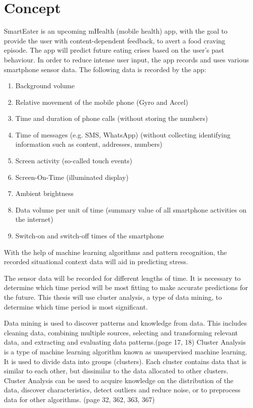 \documentclass[12pt,a4paper]{article}
\title{\titlename}
\author{ \authorid\\ \scriptsize \address }
\date{\exposedate}
\begin{document}

\maketitle

\section*{Concept}


SmartEater is an upcoming mHealth (mobile health) app, with the goal to provide the user with content-dependent feedback, to avert a food craving episode. The app will predict future eating crises based on the user's past behaviour. In order to reduce intense user input, the app records and uses various smartphone sensor data. The following data is recorded by the app:

\begin{enumerate}
	\item Background volume
	\item Relative movement of the mobile phone (Gyro and Accel)
	\item Time and duration of phone calls (without storing the numbers)
	\item Time of messages (e.g. SMS, WhatsApp) (without collecting identifying information such as content, addresses, numbers)
	\item Screen activity (so-called touch events)
	\item Screen-On-Time (illuminated display)
	\item Ambient brightness
	\item Data volume per unit of time (summary value of all smartphone activities on the internet)
	\item Switch-on and switch-off times of the smartphone
\end{enumerate}
 With the help of machine learning algorithms and pattern recognition, the recorded situational context data will aid in predicting stress.


The sensor data will be recorded for different lengths of time. It is necessary to determine which time period will be most fitting to make accurate predictions for the future. This thesis will use cluster analysis, a type of data mining, to determine which time period is most significant.

Data mining is used to discover patterns and knowledge from data. This includes cleaning data, combining multiple sources, selecting and transforming relevant data, and extracting and evaluating data patterns.(page 17, 18) 
Cluster Analysis is a type of machine learning algorithm known as unsupervised machine learning. It is used to divide data into groups (clusters). Each cluster contains data that is similar to each other, but dissimilar to the data allocated to other clusters. Cluster Analysis can be used to acquire knowledge on the distribution of the data, discover characteristics, detect outliers and reduce noise, or to preprocess data for other algorithms. (page 32, 362, 363, 367)
\end{document}
